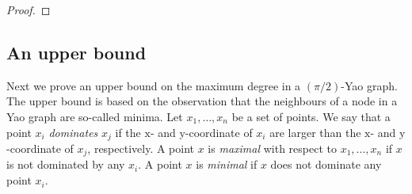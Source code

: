 \documentclass[10pt]{llncs}
\newcommand{\PROB}{\Pr}
\newcommand{\EXP}{\mathrm{E}}
\begin{document}
\begin{proof}
%
\end{proof}

\subsection{An upper bound}

Next we prove an upper bound on the maximum degree in a $(\pi/2)$-Yao graph.
The upper bound is based on the observation that the neighbours of a node
in a Yao graph are so-called minima.  Let $x_1,\ldots,x_n$ be a set of
points. We say that a point $x_i$ \emph{dominates} $x_j$ if the
$\mathrm{x}$- and $\mathrm{y}$-coordinate of $x_i$ are larger than the
$\mathrm{x}$- and $\mathrm{y}$-coordinate of $x_j$, respectively.  A point
$x$ is \emph{maximal} with respect to $x_1,\ldots,x_n$ if $x$ is not
dominated by any $x_i$.  A point $x$ is \emph{minimal} if $x$ does not
dominate any point $x_i$.
\end{document}
